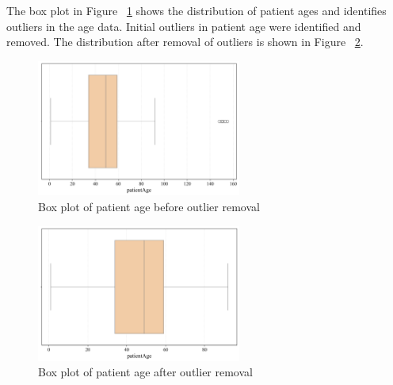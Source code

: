 The box plot in Figure ~\ref{fig:cha-2 figure15} shows the distribution of patient ages and identifies outliers in the age data. Initial outliers in patient age were identified and removed. The distribution after removal of outliers is shown in Figure ~\ref{fig:cha-2 figure16}.

\begin{figure}[H]
    \begin{center}
        \includegraphics[width = 0.6\textwidth]{figures/Figure2.png}
        \caption{Box plot of patient age before outlier removal}
        \label{fig:cha-2 figure15}
    \end{center}
\end{figure}

\begin{figure}[H]
    \begin{center}
        \includegraphics[width = 0.6\textwidth]{figures/Figure3.png}
        \caption{Box plot of patient age after outlier removal}
        \label{fig:cha-2 figure16}
    \end{center}
\end{figure}

